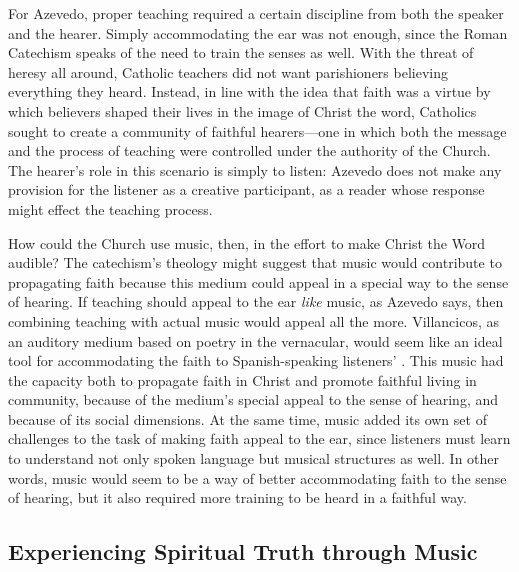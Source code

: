 For Azevedo, proper teaching required a certain discipline from both the speaker
and the hearer.
Simply accommodating the ear was not enough, since the Roman Catechism speaks of
the need to train the senses as well.
With the threat of heresy all around, Catholic teachers did not want
parishioners believing everything they heard.
Instead, in line with the idea that faith was a virtue by which believers shaped
their lives in the image of Christ the word, Catholics sought to create a
community of faithful hearers---one in which both the message and the process of
teaching were controlled under the authority of the Church.
The hearer's role in this scenario is simply to listen: Azevedo does not make
any provision for the listener as a creative participant, as a reader whose
response might effect the teaching process.

How could the Church use music, then, in the effort to make Christ the Word
audible? 
The catechism's theology might suggest that music would contribute to
propagating faith because this medium could appeal in a special way to the sense
of hearing.
If teaching should appeal to the ear \emph{like} music, as Azevedo says, then
combining teaching with actual music would appeal all the more.
Villancicos, as an auditory medium based on poetry in the vernacular, would seem
like an ideal tool for accommodating the faith to Spanish-speaking listeners'
.
This music had the capacity both to propagate faith in Christ and promote
faithful living in community, because of the medium's special appeal to the
sense of hearing, and because of its social dimensions.
At the same time, music added its own set of challenges to the task of making
faith appeal to the ear, since listeners must learn to understand not only
spoken language but musical structures as well.
In other words, music would seem to be a way of better accommodating faith to
the sense of hearing, but it also required more training to be heard in a
faithful way.

\subsection{Experiencing Spiritual Truth through Music}

